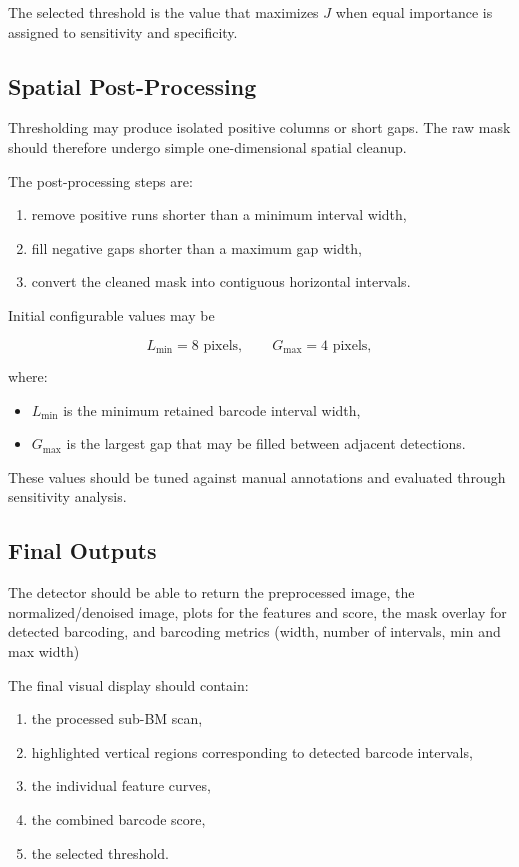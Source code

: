 \documentclass[11pt]{article}
\begin{document}
The selected threshold is the value that maximizes \(J\) when equal importance
is assigned to sensitivity and specificity.


\subsection{Spatial Post-Processing}

Thresholding may produce isolated positive columns or short gaps. The raw mask
should therefore undergo simple one-dimensional spatial cleanup.

The post-processing steps are:

\begin{enumerate}
    \item remove positive runs shorter than a minimum interval width,
    \item fill negative gaps shorter than a maximum gap width,
    \item convert the cleaned mask into contiguous horizontal intervals.
\end{enumerate}

Initial configurable values may be

\[
L_{\min}=8 \text{ pixels},
\qquad
G_{\max}=4 \text{ pixels},
\]

where:

\begin{itemize}
    \item \(L_{\min}\) is the minimum retained barcode interval width,
    \item \(G_{\max}\) is the largest gap that may be filled between adjacent
    detections.
\end{itemize}

These values should be tuned against manual annotations and evaluated through
sensitivity analysis.


\subsection{Final Outputs}

The detector should be able to return the preprocessed image, the normalized/denoised image, plots for the features and score, the mask overlay for detected barcoding, and barcoding metrics (width, number of intervals, min and max width)

The final visual display should contain:
\begin{enumerate}
    \item the processed sub-BM scan,
    \item highlighted vertical regions corresponding to detected barcode
    intervals,
    \item the individual feature curves,
    \item the combined barcode score,
    \item the selected threshold.
\end{enumerate}
\end{document}
